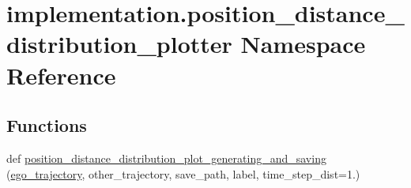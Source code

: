 \hypertarget{namespaceimplementation_1_1position__distance__distribution__plotter}{}\section{implementation.\+position\+\_\+distance\+\_\+distribution\+\_\+plotter Namespace Reference}
\label{namespaceimplementation_1_1position__distance__distribution__plotter}
\subsection*{Functions}
\begin{DoxyCompactItemize}
\item 
def \hyperlink{namespaceimplementation_1_1position__distance__distribution__plotter_a6e57e056b0bc337bf5f63e91843905fd}{position\+\_\+distance\+\_\+distribution\+\_\+plot\+\_\+generating\+\_\+and\+\_\+saving} (\hyperlink{namespaceimplementation_1_1position__distance__distribution__plotter_a89ec6d992eb771c7bae52ca515ad503a}{ego\+\_\+trajectory}, other\+\_\+trajectory, save\+\_\+path, label, time\+\_\+step\+\_\+dist=1.)
\end{DoxyCompactItemize}

